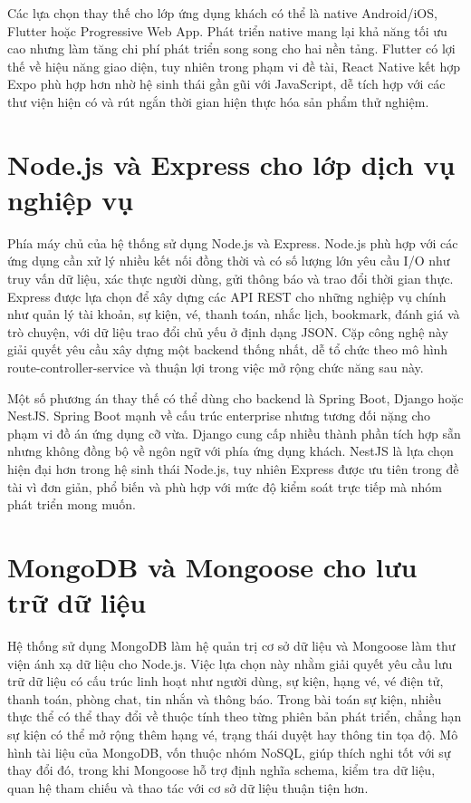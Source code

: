 \documentclass[../DoAn.tex]{subfiles}
\begin{document}
Các lựa chọn thay thế cho lớp ứng dụng khách có thể là native Android/iOS, Flutter hoặc Progressive Web App. Phát triển native mang lại khả năng tối ưu cao nhưng làm tăng chi phí phát triển song song cho hai nền tảng. Flutter có lợi thế về hiệu năng giao diện, tuy nhiên trong phạm vi đề tài, React Native kết hợp Expo phù hợp hơn nhờ hệ sinh thái gần gũi với JavaScript, dễ tích hợp với các thư viện hiện có và rút ngắn thời gian hiện thực hóa sản phẩm thử nghiệm.

\section{Node.js và Express cho lớp dịch vụ nghiệp vụ}
Phía máy chủ của hệ thống sử dụng Node.js và Express. Node.js phù hợp với các ứng dụng cần xử lý nhiều kết nối đồng thời và có số lượng lớn yêu cầu I/O như truy vấn dữ liệu, xác thực người dùng, gửi thông báo và trao đổi thời gian thực. Express được lựa chọn để xây dựng các \gls{API} \gls{REST} cho những nghiệp vụ chính như quản lý tài khoản, sự kiện, vé, thanh toán, nhắc lịch, bookmark, đánh giá và trò chuyện, với dữ liệu trao đổi chủ yếu ở định dạng \gls{JSON}. Cặp công nghệ này giải quyết yêu cầu xây dựng một backend thống nhất, dễ tổ chức theo mô hình route-controller-service và thuận lợi trong việc mở rộng chức năng sau này.

Một số phương án thay thế có thể dùng cho backend là Spring Boot, Django hoặc NestJS. Spring Boot mạnh về cấu trúc enterprise nhưng tương đối nặng cho phạm vi đồ án ứng dụng cỡ vừa. Django cung cấp nhiều thành phần tích hợp sẵn nhưng không đồng bộ về ngôn ngữ với phía ứng dụng khách. NestJS là lựa chọn hiện đại hơn trong hệ sinh thái Node.js, tuy nhiên Express được ưu tiên trong đề tài vì đơn giản, phổ biến và phù hợp với mức độ kiểm soát trực tiếp mà nhóm phát triển mong muốn.

\section{MongoDB và Mongoose cho lưu trữ dữ liệu}
Hệ thống sử dụng MongoDB làm hệ quản trị cơ sở dữ liệu và Mongoose làm thư viện ánh xạ dữ liệu cho Node.js. Việc lựa chọn này nhằm giải quyết yêu cầu lưu trữ dữ liệu có cấu trúc linh hoạt như người dùng, sự kiện, hạng vé, vé điện tử, thanh toán, phòng chat, tin nhắn và thông báo. Trong bài toán sự kiện, nhiều thực thể có thể thay đổi về thuộc tính theo từng phiên bản phát triển, chẳng hạn sự kiện có thể mở rộng thêm hạng vé, trạng thái duyệt hay thông tin tọa độ. Mô hình tài liệu của MongoDB, vốn thuộc nhóm \gls{NoSQL}, giúp thích nghi tốt với sự thay đổi đó, trong khi Mongoose hỗ trợ định nghĩa schema, kiểm tra dữ liệu, quan hệ tham chiếu và thao tác với cơ sở dữ liệu thuận tiện hơn.
\end{document}
